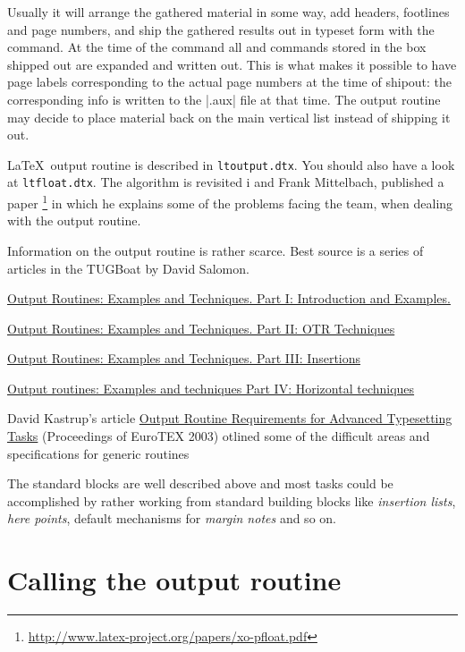 Usually it will
arrange the gathered material in some way, add headers,
footlines and page numbers, and ship the gathered results out in typeset form with the  command.
At the time of the  command all  and
 commands stored in the box shipped out are expanded and written out. This is what makes it possible to have page labels corresponding to the actual page
numbers at the time of shipout: the corresponding info
is written to the |.aux| file at that time.
The output routine may decide to place material
back on the main vertical list instead of shipping it out.

\LaTeX\ output routine is described in \texttt{ltoutput.dtx}. You should also have a look at \texttt{ltfloat.dtx}. The algorithm is revisited i  and Frank Mittelbach, published a paper
\footnote{\protect\url{http://www.latex-project.org/papers/xo-pfloat.pdf}} in which he explains some of the problems facing the team, when dealing with the output routine.


Information on the output routine is rather scarce. Best source is a series of  articles in the TUGBoat by David Salomon.

\href{http://www.tug.org/TUGboat/Articles/tb11-1/tb27salomon.pdf}{Output Routines: Examples and Techniques. Part I: Introduction and Examples.}

\href{http://www.tug.org/TUGboat/Articles/tb11-2/tb28salomon.pdf}{Output Routines: Examples and Techniques. Part II: OTR Techniques}

\href{http://www.tug.org/TUGboat/Articles/tb11-4/tb30salomon.pdf}{Output Routines: Examples and Techniques. 
Part III: Insertions}

\href{http://www.tug.org/TUGboat/Articles/tb15-1/tb42salomon-output.pdf}{Output routines: Examples and techniques Part IV: Horizontal techniques}


David Kastrup's article \href{http://www.tug.org/TUGboat/Articles/tb24-3/kastrup.pdf}{Output Routine Requirements for Advanced Typesetting Tasks} (Proceedings of EuroTEX 2003) otlined some of the difficult areas and specifications for generic routines

The standard blocks are well described above and most tasks could be accomplished 
by rather working from
standard building blocks like \textit{insertion lists}, \textit{here points},
default mechanisms for \textit{margin notes} and so on.


\section{Calling the output routine}

